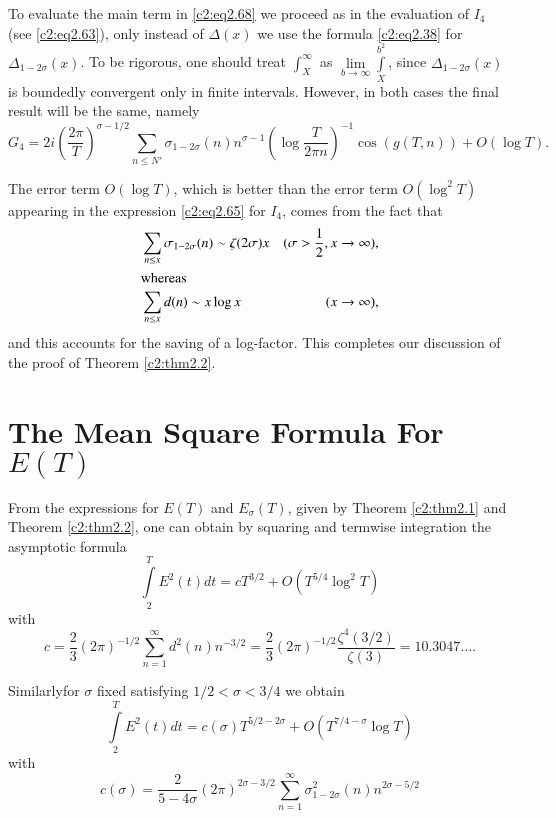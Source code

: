 To evaluate the main term in \eqref{c2:eq2.68} we proceed as in the
evaluation of $I_4$ (see \eqref{c2:eq2.63}), only instead  of
$\Delta  (x)$ we use the formula \eqref{c2:eq2.38} for $\Delta _{1
- 2 \sigma} (x)$. To be rigorous, one should treat $\int_X^\infty$ as
$\displaystyle{\lim\limits_{b \to \infty} \int\limits_X^{b^2}}$, since
$\Delta _{1- 2 \sigma} (x)$ is boundedly convergent only in finite
intervals. However, in both cases the final result will be the same,
namely
{\fontsize{10}{12}\selectfont
$$
G_4 = 2i \left(\frac{2 \pi}{T}\right)^{\sigma- 1/2} \sum_{n \leq N'}
\sigma_{1- 2 \sigma} 
(n) n^{\sigma-1} \left(\log \frac{T}{2 \pi n} \right)^{-1} \cos (g(T, 
n)) + O(\log T).
$$}

The error term $O (\log T)$, which is better than the error term\break
$O(\log^2 T)$ appearing in the expression \eqref{c2:eq2.65} for $I_4$,
comes from the fact that
\begin{align*}
& \sum_{n \leq x} \sigma_{1- 2 \sigma} (n) \sim \zeta (2 \sigma) x &
(\sigma > \frac{1}{2}, x \to \infty),\\
\intertext{whereas}
& \sum_{n \leq x}d(n) \sim x \log x & (x \to \infty),
\end{align*}
and this accounts for the saving of a log-factor. This completes our
discussion of the proof of Theorem \ref{c2:thm2.2}.

\section{The Mean Square Formula For $E(T)$}\label{c2:sec2.6}

From the expressions for $E(T)$ and $E_\sigma (T)$, given by Theorem
\ref{c2:thm2.1} and Theorem \ref{c2:thm2.2}, one can obtain by
squaring and termwise integration the asymptotic formula
\begin{equation}
  \int\limits_2^T E^2 (t) dt = c T^{3/2} + O(T^{5/4} \log^2
  T)\label{c2:eq2.69} 
\end{equation}
with
\begin{equation}
  c= \frac{2}{3} (2 \pi)^{-1/2} \sum_{n=1}^\infty d^2 (n) n^{-3/2} =
  \frac{2}{3} (2 \pi)^{-1/2} \frac{\zeta^4 (3/2)}{\zeta(3)} =
  10.3047\ldots.\label{c2:eq2.70}  
\end{equation}

Similarly\pageoriginale for $\sigma$ fixed satisfying $1/2 < \sigma <
3/4$ we obtain 
\begin{equation}
  \int\limits_2^T E^2 (t) dt = c(\sigma) T^{5/2-2 \sigma} + O
  (T^{7/4-\sigma} \log T)\label{c2:eq2.71}
\end{equation}
with
\begin{equation}
  c(\sigma) = \frac{2}{5- 4\sigma} (2 \pi)^{2 \sigma - 3/2}
  \sum_{n=1}^\infty \sigma^2_{1- 2 \sigma} (n) n^{2 \sigma -
    5/2}\label{c2:eq2.72}  
\end{equation}

